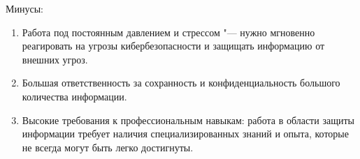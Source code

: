Минусы:
\begin{enumerate}
    \item Работа под постоянным давлением и стрессом "---  нужно мгновенно реагировать на угрозы кибербезопасности и защищать 
    информацию от внешних угроз.
    \item Большая ответственность за сохранность и конфиденциальность большого количества информации.
    \item Высокие требования к профессиональным навыкам: работа в области защиты информации требует наличия 
    специализированных знаний и опыта, которые не всегда могут быть легко достигнуты.
\end{enumerate}
